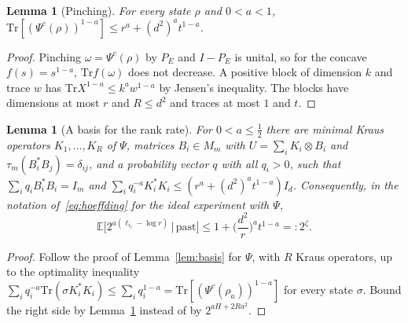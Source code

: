 \documentclass[11pt,a4paper]{article}
\theoremstyle{plain}
\newtheorem{lemma}[theorem]{Lemma}
\theoremstyle{definition}
\theoremstyle{remark}
\begin{document}
\begin{lemma}[Pinching]\label{lem:pinching}
For every state $\rho$ and $0<a<1$, $\mathrm{Tr}[(\Psi^c(\rho))^{1-a}]\le r^a+(d^2)^at^{1-a}$.
\end{lemma}

\begin{proof}
Pinching $\omega=\Psi^c(\rho)$ by $P_E$ and $I-P_E$ is unital, so for the concave $f(s)=s^{1-a}$, $\mathrm{Tr}f(\omega)$ does not decrease. A positive block of
dimension $k$ and trace $w$ has $\mathrm{Tr}X^{1-a}\le k^aw^{1-a}$ by Jensen's inequality. The blocks have dimensions at most $r$ and $R\le d^2$ and traces at most
$1$ and $t$.
\end{proof}

\begin{lemma}[A basis for the rank rate]\label{lem:rank-basis}
For $0<a\le\frac12$ there are minimal Kraus operators $K_1,\dots,K_R$ of $\Psi$, matrices $B_i\in M_m$ with $U=\sum_iK_i\otimes B_i$ and $\tau_m(B_i^*B_j)=\delta_{ij}$,
and a probability vector $q$ with all $q_i>0$, such that $\sum_iq_iB_i^*B_i=I_m$ and $\sum_iq_i^{-a}K_i^*K_i\le(r^a+(d^2)^at^{1-a})I_d$. Consequently, in the
notation of~\eqref{eq:hoeffding} for the ideal experiment with $\Psi$,
\begin{equation}\label{eq:rank-moment}
\mathbb E\big[2^{a(\ell_{i_t}-\log r)}\,\big|\,\text{past}\big]\le1+\Big(\frac{d^2}r\Big)^at^{1-a}=:2^\zeta .
\end{equation}
\end{lemma}

\begin{proof}
Follow the proof of Lemma~\ref{lem:basis} for $\Psi$, with $R$ Kraus operators, up to the optimality inequality
$\sum_iq_i^{-a}\mathrm{Tr}(\sigma K_i^*K_i)\le\sum_iq_i^{1-a}=\mathrm{Tr}[(\Psi^c(\rho_a))^{1-a}]$ for every state $\sigma$. Bound the right side by Lemma~\ref{lem:pinching}
instead of by $2^{aH+2Ra^2}$.
\end{proof}
\end{document}
